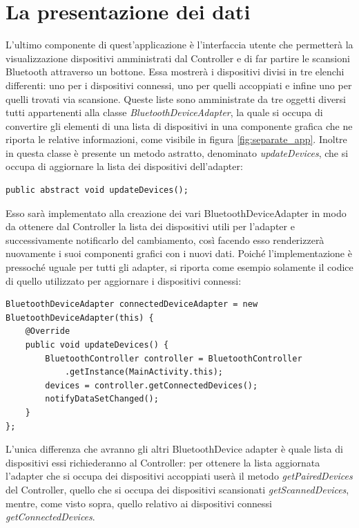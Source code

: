 \section{La presentazione dei dati}\label{ref:presentation}
L'ultimo componente di quest'applicazione è l'interfaccia utente che permetterà la visualizzazione dispositivi amministrati dal Controller e di far partire le scansioni Bluetooth attraverso un bottone. Essa mostrerà i dispositivi divisi in tre elenchi differenti: uno per i dispositivi connessi, uno per quelli accoppiati e infine uno per quelli trovati via scansione. Queste liste sono amministrate da tre oggetti diversi tutti appartenenti alla classe \textit{BluetoothDeviceAdapter}, la quale si occupa di convertire gli elementi di una lista di dispositivi in una componente grafica che ne riporta le relative informazioni, come visibile in figura \ref{fig:separate_app}.
Inoltre in questa classe è presente un metodo astratto, denominato \textit{updateDevices}, che si occupa di aggiornare la lista dei dispositivi dell'adapter:
\begin{verbatim}
public abstract void updateDevices();
\end{verbatim}
Esso sarà implementato alla creazione dei vari BluetoothDeviceAdapter in modo da ottenere dal Controller la lista dei dispositivi utili per l'adapter e successivamente notificarlo del cambiamento, così facendo esso renderizzerà nuovamente i suoi componenti grafici con i nuovi dati. Poiché l'implementazione è pressoché uguale per tutti gli adapter, si riporta come esempio solamente il codice di quello utilizzato per aggiornare i dispositivi connessi:
\begin{verbatim}
BluetoothDeviceAdapter connectedDeviceAdapter = new BluetoothDeviceAdapter(this) {
    @Override
    public void updateDevices() {
        BluetoothController controller = BluetoothController
            .getInstance(MainActivity.this);
        devices = controller.getConnectedDevices();
        notifyDataSetChanged();
    }
};
\end{verbatim}
L'unica differenza che avranno gli altri BluetoothDevice adapter è quale lista di dispositivi essi richiederanno al Controller: per ottenere la lista aggiornata l'adapter che si occupa dei dispositivi accoppiati userà il metodo \textit{getPairedDevices} del Controller, quello che si occupa dei dispositivi scansionati \textit{getScannedDevices}, mentre, come visto sopra, quello relativo ai dispositivi connessi \textit{getConnectedDevices}.

